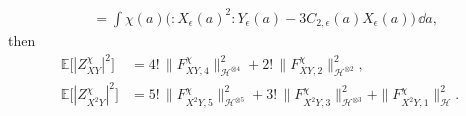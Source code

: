 \begin{proposition}
\[\begin{aligned}
  &=
  \int\chi(a)
  \bigl(:\!X_\epsilon(a)^2\!:Y_\epsilon(a)
        -3C_{2,\epsilon}(a)X_\epsilon(a)\bigr)\,\dd a ,
\end{aligned}
\]
then
\begin{equation}
\begin{aligned}
  \mathbb E\bigl[|Z_{XY}^{\chi}|^2\bigr]
  &=
  4!\,\|F_{XY,4}^{\chi}\|_{\mathcal H^{\otimes4}}^2
  +2!\,\|F_{XY,2}^{\chi}\|_{\mathcal H^{\otimes2}}^2,\\
  \mathbb E\bigl[|Z_{X^2Y}^{\chi}|^2\bigr]
  &=
  5!\,\|F_{X^2Y,5}^{\chi}\|_{\mathcal H^{\otimes5}}^2
  +3!\,\|F_{X^2Y,3}^{\chi}\|_{\mathcal H^{\otimes3}}^2
  +\|F_{X^2Y,1}^{\chi}\|_{\mathcal H}^2 .
\end{aligned}
  \label{eq:spde-nonlinear-coordinate-second-moments-from-kernels}
\end{equation}
\end{proposition}

